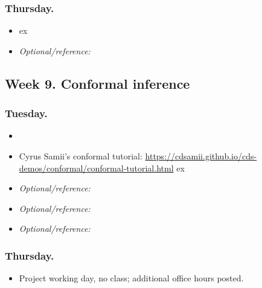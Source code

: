 \documentclass[letterpaper, 12pt, parskip=full,DIV=10]{scrartcl}
\begin{document}
\subsubsection*{Thursday.}

\begin{itemize}
\item {}  ex
\item  \textit{Optional/reference:}  
\end{itemize}

\subsection*{Week 9. Conformal inference}





\subsubsection*{Tuesday.}
\begin{itemize}
\item {} 
\item Cyrus Samii's conformal tutorial: \url{https://cdsamii.github.io/cds-demos/conformal/conformal-tutorial.html}  ex
\item  \textit{Optional/reference:}  
\item  \textit{Optional/reference:}  
\item  \textit{Optional/reference:}  
\end{itemize}


\subsubsection*{Thursday.}

\begin{itemize}
\item Project working day, no class; additional office hours posted. 
\end{itemize}
\end{document}
